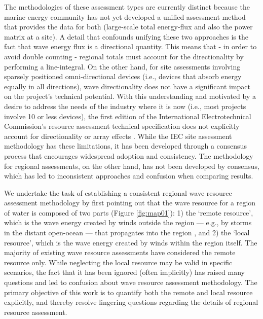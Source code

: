 \documentclass[authoryear,preprint]{elsarticle}
\begin{document}
The methodologies of these assessment types are currently distinct because the marine energy community has not yet developed a unified assessment method that provides the data for both (large-scale total energy-flux and also the power matrix at a site). 
A detail that confounds unifying these two approaches is the fact that wave energy flux is a directional quantity. This means that - in order to avoid double counting - regional totals must account for the directionality by performing a line-integral. On the other hand, for site assessments involving sparsely positioned omni-directional devices (i.e., devices that absorb energy equally in all directions), wave directionality does not have a significant impact on the project’s technical potential. With this understanding and motivated by a desire to address the needs of the industry where it is now (i.e., most projects involve 10 or less devices), the first edition of the International Electrotechnical Commission’s resource assessment technical specification does not explicitly account for directionality or array effects \citep[]{internationalelectrotechnicalcommissionPart101Wave2015}. While the IEC site assessment methodology has these limitations, it has been developed through a consensus process that encourages widespread adoption and consistency. The methodology for regional assessments, on the other hand, has not been developed by consensus, which has led to inconsistent approaches and confusion when comparing results.

We undertake the task of establishing a consistent regional wave resource assessment methodology by first pointing out that the wave resource for a region of water is composed of two parts (Figure \ref{fig:map01}): 1) the ‘remote resource’, which is the wave energy created by winds outside the region — e.g., by storms in the distant open-ocean — that propagates into the region \citep{gunnQuantifyingGlobalWave2012, hemerRevisedAssessmentAustralia2017}, and 2) the ‘local resource’, which is the wave energy created by winds within the region itself. The majority of existing wave resource assessments have considered the remote resource only. While neglecting the local resource may be valid in specific scenarios, the fact that it has been ignored (often implicitly) has raised many questions and led to confusion about wave resource assessment methodology. The primary objective of this work is to quantify both the remote and local resource explicitly, and thereby resolve lingering questions regarding the details of regional resource assessment.
\end{document}
